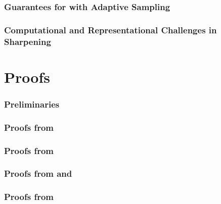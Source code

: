 \documentclass{article}
\begin{document}
\section{Guarantees for \bestofnalg with Adaptive Sampling}
\label{sec:adaptive}


\section{Computational and Representational Challenges in Sharpening}
\label{sec:hardness}


\newpage


\clearpage

\part{Proofs}

\section{Preliminaries}
\label{sec:proof_preliminaries}



\section{Proofs from }
\label{sec:proofs_sample}


\section{Proofs from }
\label{sec:proofs_lower}


\section{Proofs from  and }
\label{sec:proofs_bestofn}


\section{Proofs from }
\label{sec:proofs_rlhf}

\end{document}
